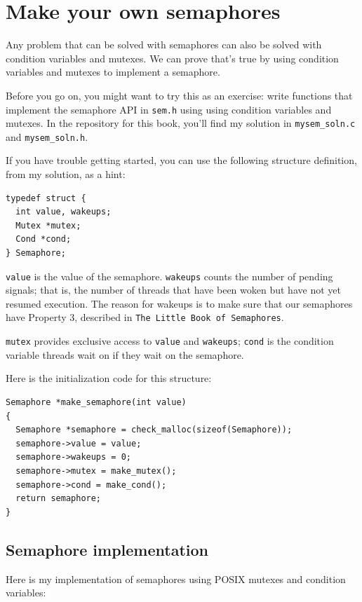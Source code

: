 \documentclass[12pt]{book}
\begin{document}
{\section{Make your own semaphores}
\label{makeyourown}

Any problem that can be solved with semaphores can also be solved
with condition variables and mutexes.  We can prove that's true
by using condition variables and mutexes to implement a semaphore.

Before you go on, you might want to try this as an exercise: write
functions that implement the semaphore API in {\tt sem.h}
using using condition variables and mutexes.  In the repository for this book, you'll find my solution in \verb"mysem_soln.c" and
\verb"mysem_soln.h".

If you have trouble getting started, you can use the following
structure definition, from my solution, as a hint:

\begin{verbatim}
typedef struct {
  int value, wakeups;
  Mutex *mutex;
  Cond *cond;
} Semaphore;
\end{verbatim}


{\tt value} is the value of the semaphore.  {\tt wakeups} counts
the number of pending signals; that is, the number of threads
that have been woken but have not yet resumed execution.  The reason
for wakeups is to make sure that our semaphores have
Property 3, described in {\tt The Little Book of Semaphores}.

{\tt mutex} provides exclusive access to {\tt value} and
{\tt wakeups}; {\tt cond} is the condition variable threads
wait on if they wait on the semaphore.

Here is the initialization code for this structure:

\begin{verbatim}
Semaphore *make_semaphore(int value)
{
  Semaphore *semaphore = check_malloc(sizeof(Semaphore));
  semaphore->value = value;
  semaphore->wakeups = 0;
  semaphore->mutex = make_mutex();
  semaphore->cond = make_cond();
  return semaphore;
}
\end{verbatim}


\subsection{Semaphore implementation}

Here is my implementation of semaphores using POSIX mutexes
and condition variables:

}
\end{document}
